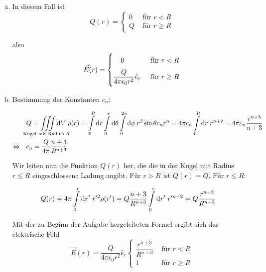 \documentclass[a4paper,german,12pt,smallheadings]{scrartcl}
\begin{document}
\begin{enumerate}[a)]
  \item
    In diesem Fall ist
    \begin{equation}
      Q(r) = \begin{cases}
        0 & \text{ für } r < R \\
        Q & \text{ für } r \ge R
      \end{cases}
    \end{equation}

    also
    \begin{equation}
      \vec{E}(r) = \begin{cases}
        \; \; \; \; 0 & \text{ für } r < R
        \vspace{0.2 cm} \\
        \dfrac{Q}{4 \pi \epsilon_0 r^2} \hat{e}_r & \text{ für } r \ge R
      \end{cases}
    \end{equation}

  \item
    Bestimmung der Konstanten $c_n$:

    \begin{align}
      &Q = \iiint\limits_{\mathclap{\text{Kugel mit Radius $R$}}} \dif V \; \rho(r)
      = \int\limits_0^R \dif r \int\limits_0^\pi \dif \theta \int\limits_0^{2 \pi} \dif \phi \; r^2 \sin \theta c_n r^n
      = 4 \pi c_n \int\limits_0^R \dif r \; r^{n+2}
      = 4 \pi c_n \frac{r^{n+3}}{n+3} \\
      \Leftrightarrow\quad
      &c_n = \frac{Q}{4 \pi} \frac{n+3}{R^{n+3}}
    \end{align}

    Wir leiten nun die Funktion $Q(r)$ her, die die in der Kugel mit Radius $r
    \le R$ eingeschlossene Ladung angibt. Für $r > R$ ist $Q(r) = Q$. Für $r \le R$:

    \begin{align}
      &Q(r) = 4 \pi \int\limits_0^r \dif r' \; r'^2 \rho(r') = Q \frac{n+3}{R^{n+3}} \int\limits_0^r \dif r' \; r'^{n+2} = Q \frac{r^{n+3}}{R^{n+3}}
    \end{align}

    Mit der zu Beginn der Aufgabe hergeleiteten Formel ergibt sich das elektrische Feld
    \begin{equation}
      \vec{E}(r) = \dfrac{Q}{4 \pi \epsilon_0 r^2} \hat{e}_r \begin{cases}
        \dfrac{r^{n+3}}{R^{n+3}} & \text{ für } r < R \\
        1 & \text{ für } r \ge R
      \end{cases}
    \end{equation}


\end{enumerate}
\end{document}
